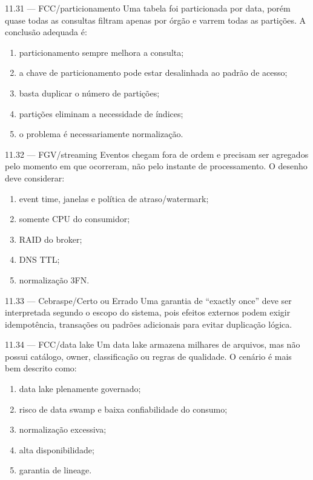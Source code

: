 \begin{questao}{ 11.31 — FCC/particionamento}
Uma tabela foi particionada por data, porém quase todas as consultas filtram apenas por órgão e varrem todas as partições. A conclusão adequada é:
\begin{enumerate}[label=\Alph*)]
\item particionamento sempre melhora a consulta;
\item a chave de particionamento pode estar desalinhada ao padrão de acesso;
\item basta duplicar o número de partições;
\item partições eliminam a necessidade de índices;
\item o problema é necessariamente normalização.
\end{enumerate}
\end{questao}

\begin{questao}{ 11.32 — FGV/streaming}
Eventos chegam fora de ordem e precisam ser agregados pelo momento em que ocorreram, não pelo instante de processamento. O desenho deve considerar:
\begin{enumerate}[label=\Alph*)]
\item event time, janelas e política de atraso/watermark;
\item somente CPU do consumidor;
\item RAID do broker;
\item DNS TTL;
\item normalização 3FN.
\end{enumerate}
\end{questao}

\begin{questao}{ 11.33 — Cebraspe/Certo ou Errado}
Uma garantia de ``exactly once'' deve ser interpretada segundo o escopo do sistema, pois efeitos externos podem exigir idempotência, transações ou padrões adicionais para evitar duplicação lógica.
\end{questao}

\begin{questao}{ 11.34 — FCC/data lake}
Um data lake armazena milhares de arquivos, mas não possui catálogo, owner, classificação ou regras de qualidade. O cenário é mais bem descrito como:
\begin{enumerate}[label=\Alph*)]
\item data lake plenamente governado;
\item risco de data swamp e baixa confiabilidade do consumo;
\item normalização excessiva;
\item alta disponibilidade;
\item garantia de lineage.
\end{enumerate}
\end{questao}

